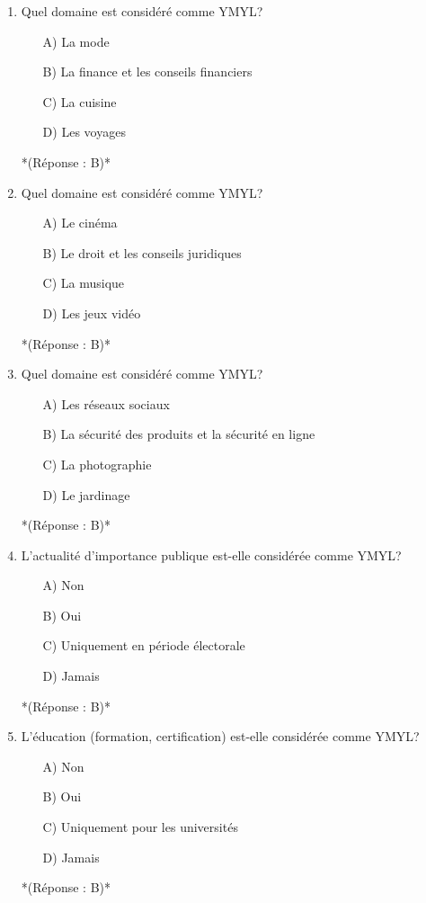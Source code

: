 \documentclass[12pt,a4paper,twoside]{report}
\begin{document}
\begin{enumerate}
\item Quel domaine est considéré comme YMYL?
\begin{itemize}
\item[A)] La mode
\item[B)] La finance et les conseils financiers
\item[C)] La cuisine
\item[D)] Les voyages
\end{itemize}
*(Réponse : B)*

\item Quel domaine est considéré comme YMYL?
\begin{itemize}
\item[A)] Le cinéma
\item[B)] Le droit et les conseils juridiques
\item[C)] La musique
\item[D)] Les jeux vidéo
\end{itemize}
*(Réponse : B)*

\item Quel domaine est considéré comme YMYL?
\begin{itemize}
\item[A)] Les réseaux sociaux
\item[B)] La sécurité des produits et la sécurité en ligne
\item[C)] La photographie
\item[D)] Le jardinage
\end{itemize}
*(Réponse : B)*

\item L'actualité d'importance publique est-elle considérée comme YMYL?
\begin{itemize}
\item[A)] Non
\item[B)] Oui
\item[C)] Uniquement en période électorale
\item[D)] Jamais
\end{itemize}
*(Réponse : B)*

\item L'éducation (formation, certification) est-elle considérée comme YMYL?
\begin{itemize}
\item[A)] Non
\item[B)] Oui
\item[C)] Uniquement pour les universités
\item[D)] Jamais
\end{itemize}
*(Réponse : B)*


\end{enumerate}
\end{document}
